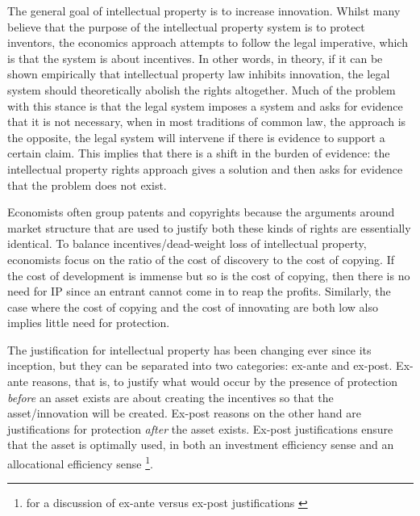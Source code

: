 \documentclass[12pt]{report}
\numberwithin{equation}{section}
\begin{document}
The general goal of intellectual property is to increase innovation. Whilst many believe that the purpose of the intellectual property system is to protect inventors, the economics approach attempts to follow the legal imperative, which is that the system is about incentives. In other words, in theory, if it can be shown empirically that intellectual property law inhibits innovation, the legal system should theoretically abolish the rights altogether. Much of the problem with this stance is that the legal system imposes a system and asks for evidence that it is not necessary, when in most traditions of common law, the approach is the opposite, the legal system will intervene if there is evidence to support a certain claim. This implies that there is a shift in the burden of evidence: the intellectual property rights approach gives a solution and then asks for evidence that the problem does not exist. 

Economists often group patents and copyrights because the arguments around market structure that are used to justify both these kinds of rights are essentially identical. To balance incentives/dead-weight loss of intellectual property, economists focus on the ratio of the cost of discovery to the cost of copying. If the cost of development is immense but so is the cost of copying, then there is no need for IP since an entrant cannot come in to reap the profits. Similarly, the case where the cost of copying and the cost of innovating are both low also implies little need for protection. 


The justification for intellectual property has been changing ever since its inception, but they can be separated into two categories: ex-ante and ex-post. Ex-ante reasons, that is, to justify what would occur by the presence of protection \textit{before} an asset exists are about creating the incentives so that the asset/innovation will be created. Ex-post reasons on the other hand are justifications for protection \textit{after} the asset exists. Ex-post justifications ensure that the asset is optimally used, in both an investment efficiency sense and an allocational efficiency sense \footnote{for a discussion of ex-ante versus ex-post justifications \cite{Lemleyt2004}}.
\end{document}
